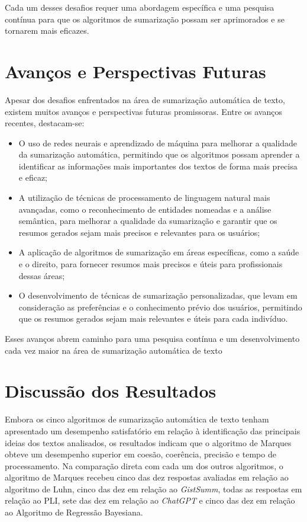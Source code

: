 Cada um desses desafios requer uma abordagem específica e uma pesquisa contínua para que os algoritmos de sumarização possam ser aprimorados e se tornarem mais eficazes.

\section{Avanços e Perspectivas Futuras}
\label{sec:avancos-futuros}

Apesar dos desafios enfrentados na área de sumarização automática de texto, existem muitos avanços e perspectivas futuras promissoras. Entre os avanços recentes, destacam-se:

\begin{itemize}
\item O uso de redes neurais e aprendizado de máquina para melhorar a qualidade da sumarização automática, permitindo que os algoritmos possam aprender a identificar as informações mais importantes dos textos de forma mais precisa e eficaz;
\item A utilização de técnicas de processamento de linguagem natural mais avançadas, como o reconhecimento de entidades nomeadas e a análise semântica, para melhorar a qualidade da sumarização e garantir que os resumos gerados sejam mais precisos e relevantes para os usuários;
\item A aplicação de algoritmos de sumarização em áreas específicas, como a saúde e o direito, para fornecer resumos mais precisos e úteis para profissionais dessas áreas;
\item O desenvolvimento de técnicas de sumarização personalizadas, que levam em consideração as preferências e o conhecimento prévio dos usuários, permitindo que os resumos gerados sejam mais relevantes e úteis para cada indivíduo.
\end{itemize}

Esses avanços abrem caminho para uma pesquisa contínua e um desenvolvimento cada vez maior na área de sumarização automática de texto

\section{Discussão dos Resultados}
\label{chap:discussao_resultados}
Embora os cinco algoritmos de sumarização automática de texto tenham apresentado um desempenho satisfatório em relação à identificação das principais ideias dos textos analisados, os resultados indicam que o algoritmo de Marques obteve um desempenho superior em coesão, coerência, precisão e tempo de processamento. Na comparação direta com cada um dos outros algoritmos, o algoritmo de Marques recebeu cinco das dez respostas avaliadas em relação ao algoritmo de Luhn, cinco das dez em relação ao \textit{GistSumm}, todas as respostas em relação ao PLI, sete das dez em relação ao \textit{ChatGPT} e cinco das dez em relação ao Algoritmo de Regressão Bayesiana.

